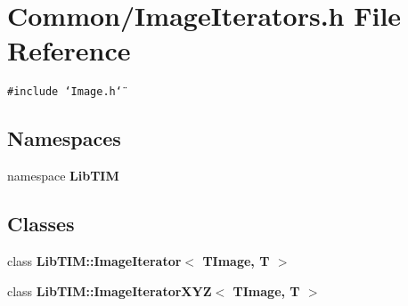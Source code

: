 \section{Common/Image\-Iterators.h File Reference}
\label{ImageIterators_8h}
{\tt \#include \char`\"{}Image.h\char`\"{}}\par
\subsection*{Namespaces}
\begin{CompactItemize}
\item 
namespace {\bf Lib\-TIM}
\end{CompactItemize}
\subsection*{Classes}
\begin{CompactItemize}
\item 
class {\bf Lib\-TIM::Image\-Iterator$<$ TImage, T $>$}
\item 
class {\bf Lib\-TIM::Image\-Iterator\-XYZ$<$ TImage, T $>$}
\end{CompactItemize}
